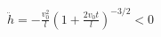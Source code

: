 \documentclass[border=2.5pt]{standalone}
\begin{document}
$\displaystyle \ddot h=-\frac{v_0^2}{l} \left(1+\frac{2v_0t}{l}\right)^{-3/2}<0$
\end{document}
